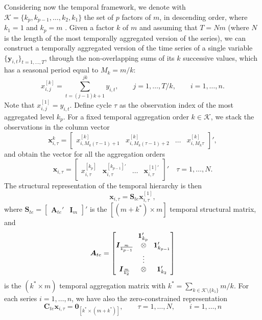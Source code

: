 \documentclass[a4paper,11pt]{article}
\newcommand{\Unovet}{\bm{1}}
\newcommand{\xvet}{\bm{x}}
\newcommand{\yvet}{\bm{y}}
\newcommand{\Avet}{\bm{A}}
\newcommand{\Cvet}{\bm{C}}
\newcommand{\Ivet}{\bm{I}}
\newcommand{\Svet}{\bm{S}}
\newcommand{\Zerovet}{\bm{0}}
\theoremstyle{definition}
\begin{document}
Considering now the temporal framework, we denote with $\mathcal{K} = \{ k_p , k_{p-1}, \dots, k_2, k_1 \}$ the set of $p$ factors of $m$, in descending order, where $k_1= 1$ and $k_p= m$ \citep{athanasopoulos2017}. Given a factor $k$ of $m$ and assuming that $T = N m$ (where $N$ is the length of the most temporally aggregated version of the series), we can construct a temporally aggregated version of the time series of a single variable $\{\yvet_{i,t}\}_{t = 1, \dots, T}$, through the non-overlapping sums of its $k$ successive values, which has a seasonal period equal to $M_k= m/k$:
$$
x_{i,j}^{[k]} = \sum_{t=(j-1)k+1}^{jk} y_{i,t},\qquad j = 1,\dots, T/k, \qquad i = 1,\dots,n.
$$
Note that $x_{i,j}^{[1]}=y_{i,t}$. Define cycle $\tau$ as the observation index of the most aggregated level $k_p$. For a fixed temporal aggregation order $k \in \mathcal{K}$, we stack the observations in the column vector
$$
\xvet_{i,\tau}^{k} = \begin{bmatrix}x_{i,M_k(\tau-1)+1}^{[k]} & x_{i,M_k(\tau-1)+2}^{[k]} & \dots & x_{i,M_k\tau}^{[k]}\end{bmatrix}',
$$
and obtain the vector for all the aggregation orders
$$
\xvet_{i,\tau} = \begin{bmatrix}
	x_{i,\tau}^{[k_p]} &
	\xvet_{i,\tau}^{[k_{p-1}]\prime} &
	\dots &
	\xvet_{i,\tau}^{[1]\prime}
\end{bmatrix}'\quad \tau = 1,\dots,N.
$$
The structural representation of the temporal hierarchy \citep{athanasopoulos2017} is then
$$
\xvet_{i,\tau} = \Svet_{te}\xvet_{i,\tau}^{[1]},
$$
where $\Svet_{te} = \begin{bmatrix}\Avet_{te}' & \Ivet_{m}\end{bmatrix}'$ is the $[(m+k^\ast) \times m]$ temporal structural matrix, and
$$
\Avet_{te} = \begin{bmatrix}
	\multicolumn{3}{c}{\Unovet_{k_p}'}\\
	\Ivet_{\frac{m}{k_{p-1}}} & \otimes & \Unovet_{k_{p-1}}'\\
	&\vdots &\\
	\Ivet_{\frac{m}{k_{2}}} & \otimes & \Unovet_{k_2}'
\end{bmatrix}
$$
is the $(k^\ast \times m)$ temporal aggregation matrix with $k^\ast = \sum_{k \in \mathcal{K}\setminus\{k_1\}} m/k$. For each series $i = 1,\dots,n$, we have also the zero-constrained representation
\begin{equation}
\label{eq:te_con}
	\Cvet_{te}\xvet_{i,\tau} = \Zerovet_{[k^\ast \times (m+k^\ast)]}, \qquad \tau = 1,\dots,N, \qquad i = 1,\dots, n
\end{equation}
\end{document}
